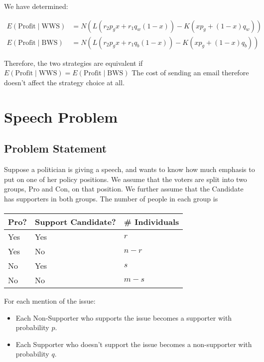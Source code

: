 \documentclass{article}
\begin{document}
We have determined:

\begin{align}
E\left( \text{Profit} \mid \text{WWS} \right)
	& = N \left( L \left( 
		r_2 p_g x
		+ r_1 q_w (1-x)  \right) 
	- K \left(x p_g + (1 - x) q_w \right) \right) \nonumber \\
E\left( \text{Profit} \mid \text{BWS} \right)
	& = N \left( L \left( 
		r_2 p_g x
		+ r_1 q_b (1-x)  \right) 
	- K \left(x p_g + (1 - x) q_b \right) \right) \nonumber
\end{align}

Therefore, the two strategies are equivalent if  
	$E\left( \text{Profit} \mid \text{WWS} \right) = 
	E\left( \text{Profit} \mid \text{BWS} \right)$
The cost of sending an email therefore doesn't affect the strategy
	choice at all.

\section{Speech Problem}

\subsection{Problem Statement}

Suppose a politician is giving a speech, and wants to know how much
	emphasis to put on one of her policy positions.
We assume that the voters are split into two groups, Pro and Con, 
	on that position.
We further assume that the Candidate has supporters in both groups.
The number of people in each group is

\paragraph{}
\begin{tabular}{|l|l|l|}
\hline
Pro? & Support Candidate? & \# Individuals\\
\hline
Yes & Yes & $r$ \\
Yes & No & $n-r$ \\
No & Yes & $s$ \\
No & No & $m-s$ \\
\hline
\end{tabular}

For each mention of the issue:
\begin{itemize}
\item Each Non-Supporter who supports the issue becomes a supporter
	with probability $p$.
\item Each Supporter who doesn't support the issue becomes a non-supporter
	with probability $q$.
\end{itemize}
\end{document}
